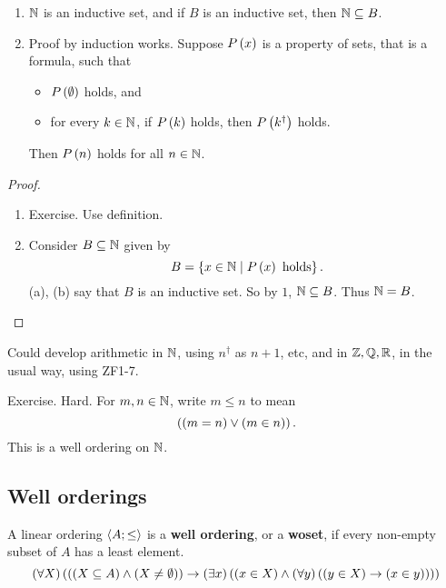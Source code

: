 \begin{theorem}
\label{thm:3.2.3}
\hfill
\begin{enumerate}
\item $ \mathbb{N} $ is an inductive set, and if $ B $ is an inductive set, then $ \mathbb{N} \subseteq B $.
\item Proof by induction works. Suppose $ P\left( x \right) $ is a property of sets, that is a formula, such that
\begin{itemize}
\item $ P\left( \emptyset \right) $ holds, and
\item for every $ k \in \mathbb{N} $, if $ P\left( k \right) $ holds, then $ P\left( k^\dagger \right) $ holds.
\end{itemize}
Then $ P\left( n \right) $ holds for all $ n \in \mathbb{N} $.
\end{enumerate}
\end{theorem}

\begin{proof}
\hfill
\begin{enumerate}
\item Exercise. Use definition.
\item Consider $ B \subseteq \mathbb{N} $ given by
$$ B = \cb{x \in \N \mid P\rb{x} \ \text{holds}}. $$
(a), (b) say that $ B $ is an inductive set. So by $ 1 $, $ \mathbb{N} \subseteq B $. Thus $ \mathbb{N} = B $.
\end{enumerate}
\end{proof}

Could develop arithmetic in $ \mathbb{N} $, using $ n^\dagger $ as $ n + 1 $, etc, and in $ \mathbb{Z}, \mathbb{Q}, \mathbb{R} $, in the usual way, using ZF1-7.

\begin{example*}
Exercise. Hard. For $ m, n \in \mathbb{N} $, write $ m \le n $ to mean
$$ \left( \left( m = n \right) \lor \left( m \in n \right) \right). $$
This is a well ordering on $ \mathbb{N} $.
\end{example*}

\pagebreak

\subsection{Well orderings}

\begin{definition}
A linear ordering $ \left\langle A; \le \right\rangle $ is a \textbf{well ordering}, or a \textbf{woset}, if every non-empty subset of $ A $ has a least element.
$$ \left( \forall X \right)\left( \left( \left( X \subseteq A \right) \land \left( X \ne \emptyset \right) \right) \rightarrow \left( \exists x \right)\left( \left( x \in X \right) \land \left( \forall y \right)\left( \left( y \in X \right) \rightarrow \left( x \in y \right) \right) \right) \right) $$
\end{definition}


